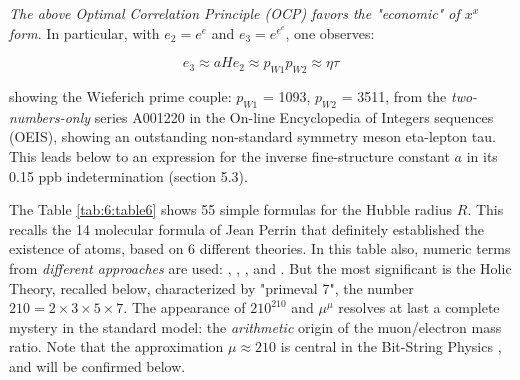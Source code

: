 \documentclass[a4paper,9pt]{article}
\begin{document}
\textit {The above Optimal Correlation Principle (OCP) favors the "economic" of $x^x$ form}. In particular, with $e_2 = e^e$ and $e_3 = e^{e^e}$, one observes:
 
\begin{equation} 
e_3 \approx a H e_2 \approx p_{W1}p_{W2} \approx \eta \tau 
 \end{equation}

showing the Wieferich prime couple: $p_{W1}$ = 1093, $p_{W2}$ = 3511, from the \textit{two-numbers-only} series A001220 in the On-line Encyclopedia of Integers sequences (OEIS), showing an outstanding non-standard symmetry meson eta-lepton tau. This leads below to an expression for the inverse fine-structure constant $a$ in its 0.15 ppb indetermination (section 5.3).

The Table \ref{tab:6:table6} shows 55 simple formulas for the Hubble radius $R$. This recalls the 14 molecular formula of Jean Perrin that definitely established the existence of atoms, based on 6 different theories. In this table also, numeric terms from \textit{different approaches} are used:  \cite{Davies}, \cite{Rees}, \cite{Eddington}, \cite{Bastin} and \cite{Atiyah}. But the most significant is the Holic Theory, recalled below, characterized by "primeval 7", the number $210 = 2 \times 3\times 5\times7$. The appearance of $210^{210}$ and $\mu^{\mu}$ resolves at last a complete mystery in the standard model: the \textit{arithmetic} origin of the muon/electron mass ratio. Note that the approximation $\mu \approx 210$ is central in the Bit-String Physics \cite{Noyes}, and will be confirmed below.






\end{document}

